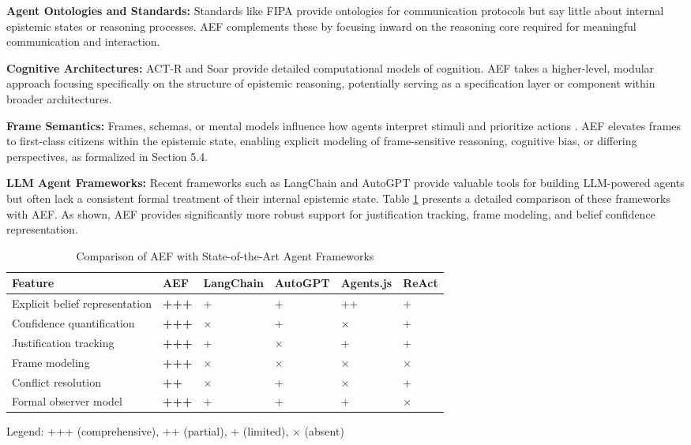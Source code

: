 \documentclass[10pt,a4paper]{article}
\begin{document}
\textbf{Agent Ontologies and Standards:} Standards like FIPA \citep{fipa2002acl, fipa2002agent, fipa2002ontology, fipa2001interaction, fipa2002communicative} provide ontologies for communication protocols but say little about internal epistemic states or reasoning processes. AEF complements these by focusing inward on the reasoning core required for meaningful communication and interaction.

\textbf{Cognitive Architectures:} ACT-R and Soar \citep{cognitive_arch1, cognitive_arch2, cognitive_arch3, cognitive_arch4, cognitive_arch5} provide detailed computational models of cognition. AEF takes a higher-level, modular approach focusing specifically on the structure of epistemic reasoning, potentially serving as a specification layer or component within broader architectures.

\textbf{Frame Semantics:} Frames, schemas, or mental models influence how agents interpret stimuli and prioritize actions \citep{fillmore1976frame, lakoff1987women, minsky1974framework}. AEF elevates frames to first-class citizens within the epistemic state, enabling explicit modeling of frame-sensitive reasoning, cognitive bias, or differing perspectives, as formalized in Section 5.4.

\textbf{LLM Agent Frameworks:} Recent frameworks such as LangChain and AutoGPT \citep{chase2023langchain, autoGPT, agents_js} provide valuable tools for building LLM-powered agents but often lack a consistent formal treatment of their internal epistemic state. Table \ref{tab:comparison} presents a detailed comparison of these frameworks with AEF. As shown, AEF provides significantly more robust support for justification tracking, frame modeling, and belief confidence representation.

\begin{table}[ht]
\centering
\caption{Comparison of AEF with State-of-the-Art Agent Frameworks}
\label{tab:comparison}
\begin{tabular}{l>{\centering\arraybackslash}p{1.5cm}>{\centering\arraybackslash}p{1.5cm}>{\centering\arraybackslash}p{1.5cm}>{\centering\arraybackslash}p{1.5cm}>{\centering\arraybackslash}p{1.5cm}}
\toprule
\textbf{Feature} & \textbf{AEF} & \textbf{LangChain} & \textbf{AutoGPT} & \textbf{Agents.js} & \textbf{ReAct} \\
\midrule
Explicit belief representation & \textbf{+++} & + & + & ++ & + \\
Confidence quantification & \textbf{+++} & $\times$ & + & $\times$ & + \\
Justification tracking & \textbf{+++} & + & $\times$ & + & + \\
Frame modeling & \textbf{+++} & $\times$ & $\times$ & $\times$ & $\times$ \\
Conflict resolution & \textbf{++} & $\times$ & + & $\times$ & + \\
Formal observer model & \textbf{+++} & + & + & + & $\times$ \\
\bottomrule
\end{tabular}
\begin{flushleft}
{Legend: +++ (comprehensive), ++ (partial), + (limited), $\times$ (absent)}
\end{flushleft}
\end{table}
\end{document}

